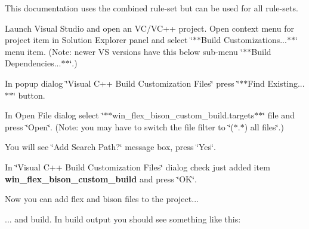 This documentation uses the combined rule-\/set but can be used for all rule-\/sets.



Launch Visual Studio and open an V\+C/\+V\+C++ project. Open context menu for project item in Solution Explorer panel and select \char`\"{}$\ast$$\ast$\+Build Customizations...$\ast$$\ast$\char`\"{} menu item. (Note\+: newer VS versions have this below sub-\/menu \char`\"{}$\ast$$\ast$\+Build Dependencies...$\ast$$\ast$\char`\"{}.)





In popup dialog \char`\"{}\+Visual C++ Build Customization Files\char`\"{} press \char`\"{}$\ast$$\ast$\+Find Existing...$\ast$$\ast$\char`\"{} button.





In Open File dialog select \char`\"{}$\ast$$\ast$win\+\_\+flex\+\_\+bison\+\_\+custom\+\_\+build.\+targets$\ast$$\ast$\char`\"{} file and press \char`\"{}\+Open\char`\"{}. (Note\+: you may have to switch the file filter to \char`\"{}($\ast$.$\ast$) all files\char`\"{}.)



You will see \char`\"{}\+Add Search Path?\char`\"{} message box, press \char`\"{}\+Yes\char`\"{}.





In \char`\"{}\+Visual C++ Build Customization Files\char`\"{} dialog check just added item {\bfseries{win\+\_\+flex\+\_\+bison\+\_\+custom\+\_\+build}} and press \char`\"{}\+O\+K\char`\"{}.





Now you can add flex and bison files to the project...



... and build. In build output you should see something like this\+:


\begin{DoxyCode}{0}
\end{DoxyCode}


